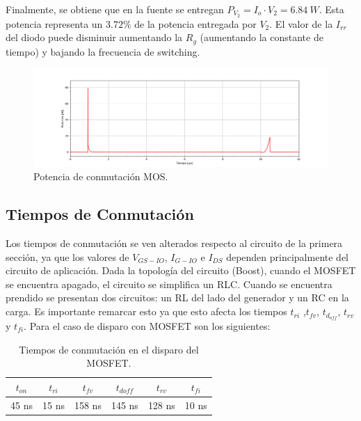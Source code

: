 Finalmente, se obtiene que en la fuente se entregan $P_{V_2}=I_o \cdot V_2 = 6.84 \ W$. Esta potencia representa un $3.72 \%$ de la potencia entregada por $V_2$.
El valor de la $I_{rr}$ del diodo puede disminuir aumentando la $R_g$ (aumentando la constante de tiempo) y bajando la frecuencia de switching. 
\begin{figure}[H]
	\centering
	\includegraphics[width=\linewidth]{ImagenesEjercicio-3/potencia-mos}
	\caption{Potencia de conmutación MOS.}
	\label{fig:ej3:conmutacionON_OFF_VDS_IDS_SWITCH_BOOST}
\end{figure}

\subsection{Tiempos de Conmutación}
Los tiempos de conmutación se ven alterados respecto al circuito de la primera sección, ya que los valores de $V_{GS-IO}$, $I_{G-IO}$ e $I_{DS}$ dependen principalmente del circuito de aplicación. Dada la topología del circuito (Boost), cuando el MOSFET se encuentra apagado, el circuito se simplifica un RLC. Cuando se encuentra prendido se presentan dos circuitos: un RL del lado del generador y un RC en la carga. Es importante remarcar esto ya que esto afecta los tiempos $t_{ri}$ ,$t_{fv}$, $t_{d_{off}}$, $t_{rv}$ y  $t_{fi}$. Para el caso de disparo con MOSFET son los siguientes:
\begin{table}[H]
\center
\begin{tabular}{cccccc}
\hline
$t_{on}$ & $t_{ri}$ & $t_{fv}$ & $t_{doff}$ & $t_{rv}$ & $t_{fi}$          \\	\hline
45 ns       & 15 ns       & 158 ns      & 145 ns        & 128 ns      & 10 ns     \\	 	\hline
\end{tabular}
\caption{Tiempos de conmutación en el disparo del MOSFET.}
\end{table}


